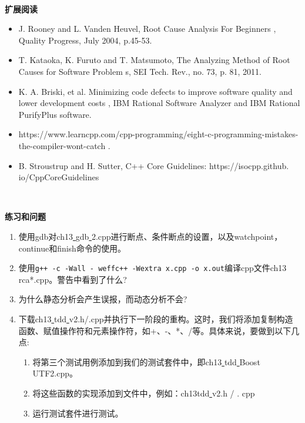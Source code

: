 \noindent\textbf{}\ \par
\textbf{扩展阅读} \ \par
\begin{itemize}
	\item J. Rooney and L. Vanden Heuvel,  Root Cause Analysis For Beginners , Quality Progress, July 2004, p.45-53.
	\item T. Kataoka, K. Furuto and T. Matsumoto,  The Analyzing Method of Root Causes for Software Problem s, SEI Tech. Rev., no. 73, p. 81, 2011.
	\item K. A. Briski, et al.  Minimizing code defects to improve software quality and lower development costs , IBM Rational Software Analyzer and IBM	Rational PurifyPlus software.
	\item https://www.learncpp.com/cpp-programming/eight-c-programming-mistakes-the-compiler-wont-catch .
	\item B. Stroustrup and H. Sutter, C++ Core Guidelines:  https:/​/​isocpp.​github.​io/CppCoreGuidelines 
\end{itemize}

\noindent\textbf{}\ \par
\textbf{练习和问题} \ \par
\begin{enumerate}
	\item 使用gdb对ch13\underline{ }gdb\underline{ }2.cpp进行断点、条件断点的设置，以及watchpoint，continue和finish命令的使用。
	\item 使用\texttt{g++ -c -Wall - weffc++ -Wextra x.cpp -o x.out}编译cpp文件ch13\underline{ }rca*.cpp。警告中看到了什么?
	\item 为什么静态分析会产生误报，而动态分析不会?
	\item 下载ch13\underline{ }tdd\underline{ }v2.h/.cpp并执行下一阶段的重构。这时，我们将添加复制构造函数、赋值操作符和元素操作符，如+、-、*、/等。具体来说，要做到以下几点:
	\begin{enumerate}
		\item 将第三个测试用例添加到我们的测试套件中，即ch13\underline{ }tdd\underline{ }Boost\underline{ }UTF2.cpp。
		\item 将这些函数的实现添加到文件中，例如：ch13tdd\underline{ }v2.h / . cpp
		\item 运行测试套件进行测试。
	\end{enumerate}
\end{enumerate}

\newpage